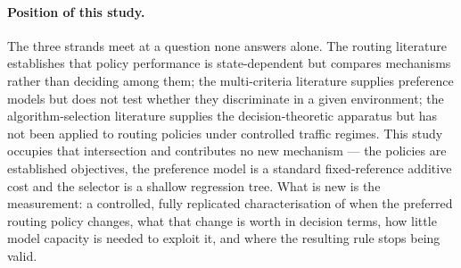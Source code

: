 \paragraph{Position of this study.}
The three strands meet at a question none answers alone. The routing literature
establishes that policy performance is state-dependent but compares mechanisms rather than
deciding among them; the multi-criteria literature supplies preference models but does not
test whether they discriminate in a given environment; the algorithm-selection literature
supplies the decision-theoretic apparatus but has not been applied to routing policies
under controlled traffic regimes. This study occupies that intersection and contributes no
new mechanism --- the policies are established objectives, the preference model is a
standard fixed-reference additive cost and the selector is a shallow regression tree. What
is new is the measurement: a controlled, fully replicated characterisation of when the
preferred routing policy changes, what that change is worth in decision terms, how little
model capacity is needed to exploit it, and where the resulting rule stops being valid.
